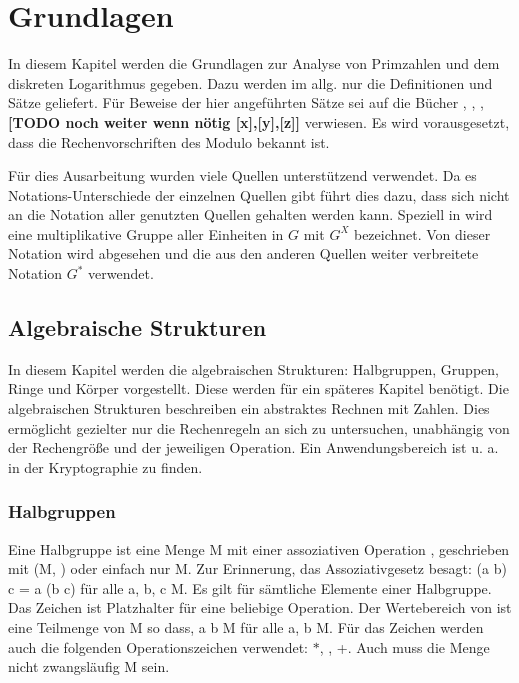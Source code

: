 \section{Grundlagen}\label{Kapitel Grundlagen}
	In diesem Kapitel werden die Grundlagen zur Analyse von Primzahlen und dem diskreten Logarithmus gegeben. Dazu werden im allg. nur die Definitionen und Sätze geliefert. Für Beweise der hier angeführten Sätze sei auf die Bücher \cite{Kryptografie:in:Theorie:und:Praxis}, \cite{Erste:Hilfe:in:Linearer:Algebra}, \cite{Kryptographie:und:IT-Sicherheit}, \cite{Information:und:Kommunikation} \textbf{[TODO noch weiter wenn nötig [x],[y],[z]]} verwiesen. Es wird vorausgesetzt, dass die Rechenvorschriften des Modulo bekannt ist.
	
	Für dies Ausarbeitung wurden viele Quellen unterstützend verwendet. Da es Notations-Unterschiede der einzelnen Quellen gibt führt dies dazu, dass sich nicht an die Notation aller genutzten Quellen gehalten werden kann. Speziell in \cite{Erste:Hilfe:in:Linearer:Algebra} wird eine multiplikative Gruppe aller Einheiten in $G$ mit $G^X$ bezeichnet. Von dieser Notation wird abgesehen und die aus den anderen Quellen weiter verbreitete Notation $G^*$ verwendet.
	
	\subsection{Algebraische Strukturen}
		In diesem Kapitel werden die algebraischen Strukturen: Halbgruppen, Gruppen, Ringe und Körper vorgestellt. Diese werden für ein späteres Kapitel benötigt. Die algebraischen Strukturen beschreiben ein abstraktes Rechnen mit Zahlen. Dies ermöglicht gezielter nur die Rechenregeln an sich zu untersuchen, unabhängig von der Rechengröße und der jeweiligen Operation. Ein Anwendungsbereich ist u. a. in der Kryptographie zu finden.~\cite{Kryptographie:und:Algorithmen}
	
		\subsubsection{Halbgruppen}
			Eine Halbgruppe ist eine Menge M mit einer assoziativen Operation \mycircOhne, geschrieben mit (M, \mycircOhne) oder einfach nur M. Zur Erinnerung, das Assoziativgesetz besagt: (a \mycirc b) \mycirc c = a \mycirc (b \mycirc c) für alle a, b, c \myin M. Es gilt für sämtliche Elemente einer Halbgruppe. Das Zeichen \mycirc ist Platzhalter für eine beliebige Operation. Der Wertebereich von \mycirc ist eine Teilmenge von M so dass, a \mycirc b \myin M für alle a, b \myin M. Für das Zeichen \mycirc werden auch die folgenden Operationszeichen verwendet: $*$, \mycdotOhne, +. Auch muss die Menge nicht zwangsläufig M sein.~\cite{Erste:Hilfe:in:Linearer:Algebra}
			
